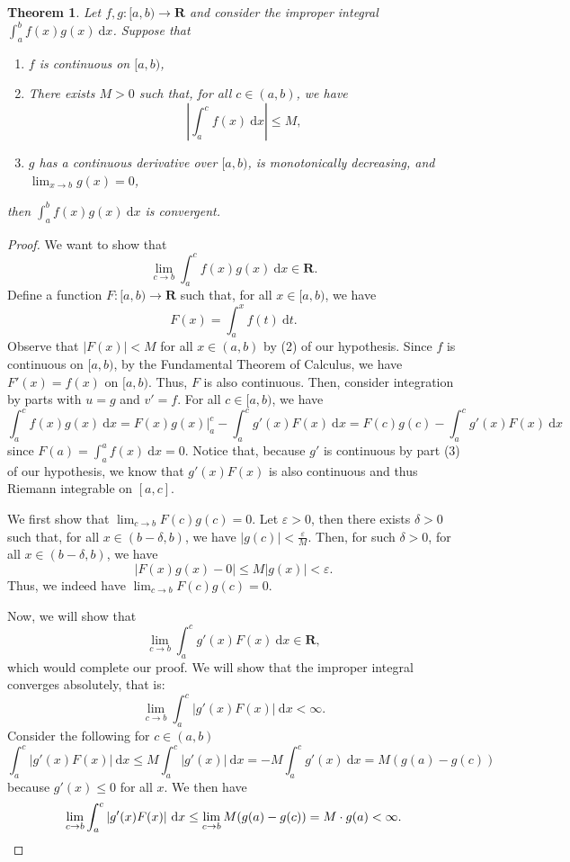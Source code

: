 \documentclass[11pt]{article} %
\theoremstyle{plain}
\newtheorem{thm}{Theorem}[section]
\newcommand{\R}{\mathbf{R}}
\begin{document}
\newpage
\begin{thm}
Let $f,g \colon [a,b)\to \R$ and consider the improper integral $\int_a^b f(x)g(x)\ \mathrm{d}x$. Suppose that
\begin{enumerate}
	\item $f$ is continuous on $[a,b)$,
	\item There exists $M>0$ such that, for all $c\in(a,b)$, we have
	\[\left|\int_a^c f(x)\ \mathrm{d}x\right|\leq M,\]
	\item $g$ has a continuous derivative over $[a,b)$, is monotonically decreasing, and $\lim_{x\to b}g(x) = 0$,
\end{enumerate}
then $\int_a^b f(x)g(x)\ \mathrm{d}x$ is convergent.
\end{thm}



\begin{proof}
We want to show that
\[\lim_{c\to b} \int_a^c f(x)g(x)\ \mathrm{d}x \in \R.\]
Define a function $F \colon [a,b)\to\R$ such that, for all $x\in[a,b)$, we have
\[F(x) = \int_{a}^{x} f(t) \ \mathrm{d}t.\]
Observe that $|F(x)|<M$ for all $x\in(a,b)$ by (2) of our hypothesis. Since $f$ is continuous on $[a,b)$, by the Fundamental Theorem of Calculus, we have $F'(x)=f(x)$ on $[a,b)$. Thus, $F$ is also continuous. Then, consider integration by parts with $u=g$ and $v'=f$. For all $c\in[a,b)$, we have
\[\int_{a}^{c} f(x)g(x) \ \mathrm{d}x = F(x)g(x)\Big|_a^c - \int_{a}^{c} g'(x)F(x) \ \mathrm{d}x = F(c)g(c) - \int_{a}^{c} g'(x)F(x) \ \mathrm{d}x\]
since $F(a) = \int_a^a f(x)\ \mathrm{d}x = 0$. Notice that, because $g'$ is continuous by part (3) of our hypothesis, we know that $g'(x)F(x)$ is also continuous and thus Riemann integrable on $[a,c]$. 

We first show that $\lim_{c\to b} F(c)g(c) = 0$. Let $\varepsilon>0$, then there exists $\delta>0$ such that, for all $x\in (b-\delta,b)$, we have $|g(c)|<\frac{\varepsilon}{M}$. Then, for such $\delta>0$, for all $x\in(b-\delta,b)$, we have
\[|F(x)g(x)-0|\leq M|g(x)| <\varepsilon.\]
Thus, we indeed have $\lim_{c\to b} F(c)g(c) = 0$.

Now, we will show that
\[\lim_{c\to b}\int_{a}^{c} g'(x)F(x) \ \mathrm{d}x \in \R,\]
which would complete our proof. We will show that the improper integral converges absolutely, that is: 
\[\lim_{c\to b}\int_{a}^{c} |g'(x)F(x)|\ \mathrm{d}x < \infty.\]
Consider the following for $c\in(a,b)$
\[\int_{a}^{c} |g'(x)F(x)|\ \mathrm{d}x \leq M \int_a^c |g'(x)|\ \mathrm{d}x = -M\int_a^c g'(x)\ \mathrm{d}x = M(g(a)-g(c))\]
because $g'(x)\leq 0$ for all $x$. We then have
\[\lim_{c\to b} \int_{a}^{c} |g'(x)F(x)|\ \mathrm{d}x\leq \lim_{c\to b} M(g(a)-g(c)) = M\cdot g(a) <\infty. \qedhere\]
\end{proof}
\end{document}
